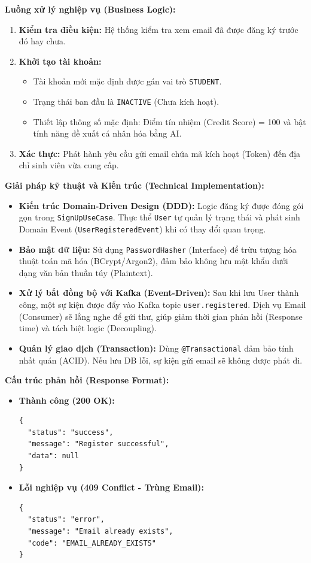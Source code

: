 \noindent\textbf{Luồng xử lý nghiệp vụ (Business Logic):}
\begin{enumerate}
    \item \textbf{Kiểm tra điều kiện:} Hệ thống kiểm tra xem email đã được đăng ký trước đó hay chưa.
    \item \textbf{Khởi tạo tài khoản:} 
    \begin{itemize}
        \item Tài khoản mới mặc định được gán vai trò \texttt{STUDENT}.
        \item Trạng thái ban đầu là \texttt{INACTIVE} (Chưa kích hoạt).
        \item Thiết lập thông số mặc định: Điểm tín nhiệm (Credit Score) = 100 và bật tính năng đề xuất cá nhân hóa bằng AI.
    \end{itemize}
    \item \textbf{Xác thực:} Phát hành yêu cầu gửi email chứa mã kích hoạt (Token) đến địa chỉ sinh viên vừa cung cấp.
\end{enumerate}

\noindent\textbf{Giải pháp kỹ thuật và Kiến trúc (Technical Implementation):}
\begin{itemize}
    \item \textbf{Kiến trúc Domain-Driven Design (DDD):} Logic đăng ký được đóng gói gọn trong \texttt{SignUpUseCase}. Thực thể \texttt{User} tự quản lý trạng thái và phát sinh Domain Event (\texttt{UserRegisteredEvent}) khi có thay đổi quan trọng.
    \item \textbf{Bảo mật dữ liệu:} Sử dụng \texttt{PasswordHasher} (Interface) để trừu tượng hóa thuật toán mã hóa (BCrypt/Argon2), đảm bảo không lưu mật khẩu dưới dạng văn bản thuần túy (Plaintext).
    \item \textbf{Xử lý bất đồng bộ với Kafka (Event-Driven):} Sau khi lưu User thành công, một sự kiện được đẩy vào Kafka topic \texttt{user.registered}. Dịch vụ Email (Consumer) sẽ lắng nghe để gửi thư, giúp giảm thời gian phản hồi (Response time) và tách biệt logic (Decoupling).
    \item \textbf{Quản lý giao dịch (Transaction):} Dùng \texttt{@Transactional} đảm bảo tính nhất quán (ACID). Nếu lưu DB lỗi, sự kiện gửi email sẽ không được phát đi.
\end{itemize}


\noindent\textbf{Cấu trúc phản hồi (Response Format):}
\begin{itemize}
    \item \textbf{Thành công (200 OK):}
\begin{verbatim}
{
  "status": "success",
  "message": "Register successful",
  "data": null
}
\end{verbatim}
    \item \textbf{Lỗi nghiệp vụ (409 Conflict - Trùng Email):}
\begin{verbatim}
{
  "status": "error",
  "message": "Email already exists",
  "code": "EMAIL_ALREADY_EXISTS"
}
\end{verbatim}
\end{itemize}

